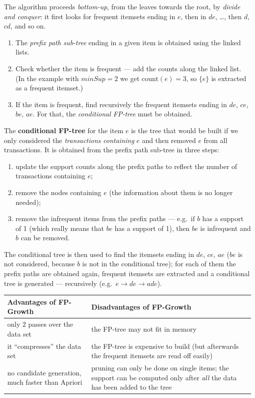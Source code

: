 \documentclass[11pt,a4paper]{article}
\theoremstyle{definition}
\providecommand{\uv}[1]{``#1''}
\begin{document}
\begin{defbox}
The algorithm proceeds \emph{bottom-up}, from the leaves towards the root, by \emph{divide and
conquer}: it first looks for frequent itemsets ending in $e$, then in $de$, \dots, then $d$,
$cd$, and so on.

\begin{enumerate}
\item The \emph{prefix path sub-tree} ending in a given item is obtained using the linked lists.
\item Check whether the item is frequent --- add the counts along the linked list. (In the example
      with $\mathit{minSup}=2$ we get $\mathrm{count}(e)=3$, so $\{e\}$ is extracted as a frequent
      itemset.)
\item If the item is frequent, find recursively the frequent itemsets ending in $de$, $ce$, $be$,
      $ae$. For that, the \emph{conditional FP-tree} must be obtained.
\end{enumerate}

The \textbf{conditional FP-tree} for the item $e$ is the tree that would be built if we only
considered the \emph{transactions containing} $e$ and then removed $e$ from all transactions. It
is obtained from the prefix path sub-tree in three steps:
\begin{enumerate}
\item update the support counts along the prefix paths to reflect the number of transactions
      containing $e$;
\item remove the nodes containing $e$ (the information about them is no longer needed);
\item remove the infrequent items from the prefix paths --- e.g.\ if $b$ has a support of 1
      (which really means that $be$ has a support of 1), then $be$ is infrequent and $b$ can be
      removed.
\end{enumerate}
The conditional tree is then used to find the itemsets ending in $de$, $ce$, $ae$ ($be$ is not
considered, because $b$ is not in the conditional tree); for each of them the prefix paths are
obtained again, frequent itemsets are extracted and a conditional tree is generated ---
recursively (e.g.\ $e\to de\to ade$).
\end{defbox}

\begin{center}
\small
\begin{tabular}{@{}p{7.6cm}p{8.0cm}@{}}
\toprule
\textbf{Advantages of FP-Growth} & \textbf{Disadvantages of FP-Growth} \\
\midrule
only 2 passes over the data set & the FP-tree may not fit in memory \\
it \uv{compresses} the data set & the FP-tree is expensive to build (but afterwards the frequent
  itemsets are read off easily) \\
no candidate generation, much faster than Apriori & pruning can only be done on single items;
  the support can be computed only after \emph{all} the data has been added to the tree \\
\bottomrule
\end{tabular}
\end{center}
\end{document}
